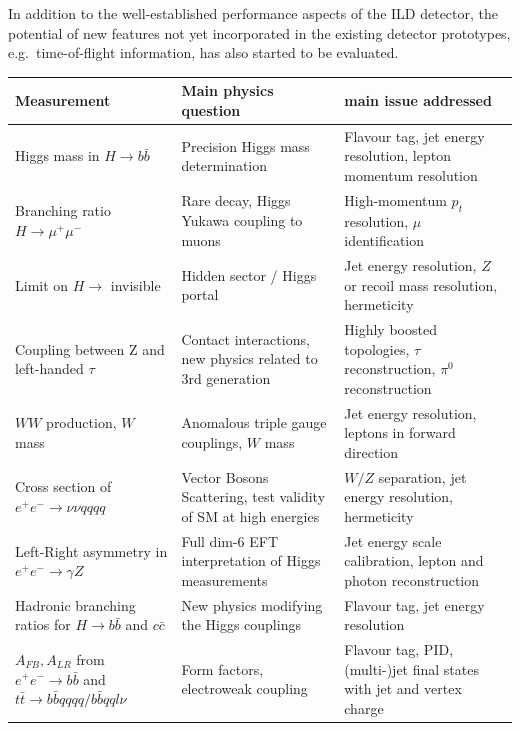 In addition to the well-established performance aspects of the ILD detector, the potential of new features not yet incorporated in the existing detector prototypes, e.g.\ time-of-flight information, has also started to be evaluated.

\begin{table}[thb]
  \setlength\extrarowheight{5pt}
    \centering
    \begin{tabular}{ p{4cm} p{5cm} p{5cm}}
 \hline
{\bf    Measurement}     & {\bf Main physics question} & {\bf main issue addressed} \\
\hline
Higgs mass in $H\rightarrow b {\bar b}$         &  Precision Higgs mass determination &Flavour tag, jet energy resolution, lepton momentum resolution  \\
\hline
Branching ratio $H \rightarrow \mu^+\mu^-$ & Rare decay, Higgs Yukawa coupling to muons & High-momentum $p_t$ resolution, $\mu$ identification \\
\hline
Limit on $H \rightarrow$ invisible & Hidden sector / Higgs portal & Jet energy resolution, $Z$ or recoil mass resolution, hermeticity\\
\hline
Coupling between Z and left-handed $\tau$ & Contact interactions, new physics related to 3rd generation & Highly boosted topologies, $\tau$ reconstruction, $\pi^0$ reconstruction \\
\hline
$WW$ production, $W$ mass & Anomalous triple gauge couplings, $W$ mass&  Jet energy resolution, leptons in forward direction \\
\hline
Cross section of ${e^+e^- \rightarrow \nu \nu qqqq}$ & Vector Bosons Scattering, test validity of SM at high energies&  $W/Z$ separation, jet energy resolution, hermeticity\\
\hline
Left-Right asymmetry in $e^+e^- \rightarrow \gamma Z$ & Full dim-6 EFT interpretation of Higgs measurements &  Jet energy scale calibration, lepton and photon reconstruction \\
\hline
Hadronic branching ratios for $H\rightarrow b \bar b $ and $c \bar c$ & New physics modifying the Higgs couplings &  Flavour tag, jet energy resolution\\

\hline
$A_{FB}, A_{LR}$ from ${e^+e^- \to b\bar{b}}$ and $t \bar t \rightarrow b\bar{b} qqqq / b \bar{b} qql\nu$ & Form factors, electroweak coupling &  Flavour tag, PID, (multi-)jet final states with jet and vertex charge\\
\hline


\end{tabular}
\end{table}
